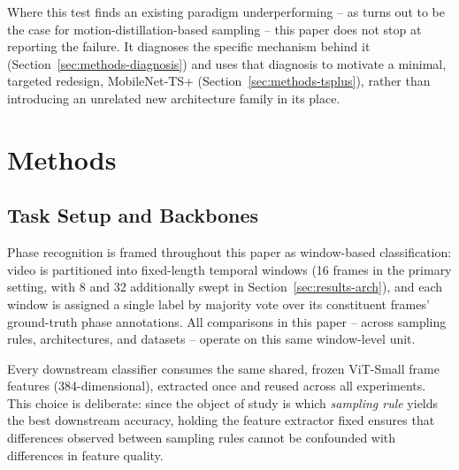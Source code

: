 \documentclass[preprint,12pt]{elsarticle}
\begin{document}
Where this test finds an existing paradigm underperforming -- as turns out to be the case for motion-distillation-based sampling -- this paper does not stop at reporting the failure. It diagnoses the specific mechanism behind it (Section~\ref{sec:methods-diagnosis}) and uses that diagnosis to motivate a minimal, targeted redesign, MobileNet-TS+ (Section~\ref{sec:methods-tsplus}), rather than introducing an unrelated new architecture family in its place.

\section{Methods}
\label{sec:methods}

\subsection{Task Setup and Backbones}
\label{sec:methods-setup}

Phase recognition is framed throughout this paper as window-based classification: video is partitioned into fixed-length temporal windows (16 frames in the primary setting, with 8 and 32 additionally swept in Section~\ref{sec:results-arch}), and each window is assigned a single label by majority vote over its constituent frames' ground-truth phase annotations. All comparisons in this paper -- across sampling rules, architectures, and datasets -- operate on this same window-level unit.

Every downstream classifier consumes the same shared, frozen ViT-Small frame features (384-dimensional), extracted once and reused across all experiments. This choice is deliberate: since the object of study is which \emph{sampling rule} yields the best downstream accuracy, holding the feature extractor fixed ensures that differences observed between sampling rules cannot be confounded with differences in feature quality.
\end{document}
